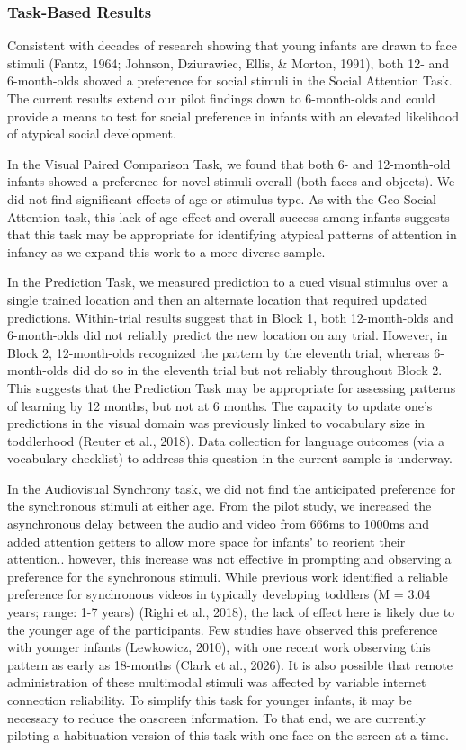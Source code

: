\documentclass[
  english,
  man,floatsintext]{apa6}
\begin{document}
\subsubsection{Task-Based Results}\label{task-based-results}

Consistent with decades of research showing that young infants are drawn to face stimuli (Fantz, 1964; Johnson, Dziurawiec, Ellis, \& Morton, 1991), both 12- and 6-month-olds showed a preference for social stimuli in the Social Attention Task.
The current results extend our pilot findings down to 6-month-olds and could provide a means to test for social preference in infants with an elevated likelihood of atypical social development.

In the Visual Paired Comparison Task, we found that both 6- and 12-month-old infants showed a preference for novel stimuli overall (both faces and objects).
We did not find significant effects of age or stimulus type.
As with the Geo-Social Attention task, this lack of age effect and overall success among infants suggests that this task may be appropriate for identifying atypical patterns of attention in infancy as we expand this work to a more diverse sample.

In the Prediction Task, we measured prediction to a cued visual stimulus over a single trained location and then an alternate location that required updated predictions.
Within-trial results suggest that in Block 1, both 12-month-olds and 6-month-olds did not reliably predict the new location on any trial.
However, in Block 2, 12-month-olds recognized the pattern by the eleventh trial, whereas 6-month-olds did do so in the eleventh trial but not reliably throughout Block 2.
This suggests that the Prediction Task may be appropriate for assessing patterns of learning by 12 months, but not at 6 months.
The capacity to update one's predictions in the visual domain was previously linked to vocabulary size in toddlerhood (Reuter et al., 2018).
Data collection for language outcomes (via a vocabulary checklist) to address this question in the current sample is underway.

In the Audiovisual Synchrony task, we did not find the anticipated preference for the synchronous stimuli at either age.
From the pilot study, we increased the asynchronous delay between the audio and video from 666ms to 1000ms and added attention getters to
allow more space for infants' to reorient their attention..
however, this increase was not effective in prompting and observing a preference for the synchronous stimuli.
While previous work identified a reliable preference for synchronous videos in typically developing toddlers (M = 3.04 years; range: 1-7 years) (Righi et al., 2018), the lack of effect here is likely due to the younger age of the participants.
Few studies have observed this preference with younger infants (Lewkowicz, 2010), with one recent work observing this pattern as early as 18-months (Clark et al., 2026).
It is also possible that remote administration of these multimodal stimuli was affected by variable internet connection reliability.
To simplify this task for younger infants, it may be necessary to reduce the onscreen information.
To that end, we are currently piloting a habituation version of this task with one face on the screen at a time.
\end{document}
